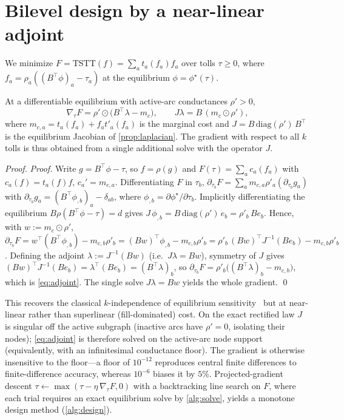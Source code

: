 \documentclass[ijoc]{informs3}
\begin{document}
\section{Bilevel design by a near-linear adjoint}\label{sec:design}
We minimize $F=\mathrm{TSTT}(f)=\sum_a t_a(f_a)f_a$ over tolls $\tau\ge0$, where $f_a=\rho_a((B^\top\phi)_a-\tau_a)$
at the equilibrium $\phi=\phi^\star(\tau)$.

\begin{proposition}\label{prop:adjoint}
At a differentiable equilibrium with active-arc conductances $\rho'>0$,
\begin{equation}\label{eq:adjoint}
\nabla_\tau F=\rho'\odot\big(B^\top\lambda-m_c\big),\qquad J\lambda=B\,(m_c\odot\rho'),
\end{equation}
where $m_{c,a}=t_a(f_a)+f_a t'_a(f_a)$ is the marginal cost and $J=B\,\mathrm{diag}(\rho')\,B^\top$ is the
equilibrium Jacobian of \cref{prop:laplacian}. The gradient with respect to all $k$ tolls is thus obtained from a
single additional solve with the operator $J$.
\end{proposition}
\begin{proof}{\it Proof.}
Write $g=B^\top\phi-\tau$, so $f=\rho(g)$ and $F(\tau)=\sum_a c_a(f_a)$ with $c_a(f)=t_a(f)f$, $c_a'=m_{c,a}$.
Differentiating $F$ in $\tau_b$, $\partial_{\tau_b}F=\sum_a m_{c,a}\rho'_a(\partial_{\tau_b}g_a)$ with
$\partial_{\tau_b}g_a=(B^\top\phi_{,b})_a-\delta_{ab}$, where $\phi_{,b}=\partial\phi^\star/\partial\tau_b$.
Implicitly differentiating the equilibrium $B\rho(B^\top\phi-\tau)=d$ gives
$J\,\phi_{,b}=B\,\mathrm{diag}(\rho')\,e_b=\rho'_b\,B e_b$. Hence, with $w:=m_c\odot\rho'$,
$\partial_{\tau_b}F=w^\top(B^\top\phi_{,b})-m_{c,b}\rho'_b=(Bw)^\top\phi_{,b}-m_{c,b}\rho'_b
=\rho'_b\,(Bw)^\top J^{-1}(Be_b)-m_{c,b}\rho'_b$. Defining the adjoint $\lambda:=J^{-1}(Bw)$ (i.e.\ $J\lambda=Bw$),
symmetry of $J$ gives $(Bw)^\top J^{-1}(Be_b)=\lambda^\top(Be_b)=(B^\top\lambda)_b$, so
$\partial_{\tau_b}F=\rho'_b\big((B^\top\lambda)_b-m_{c,b}\big)$, which is \cref{eq:adjoint}. The single solve
$J\lambda=Bw$ yields the whole gradient. \qed
\end{proof}
This recovers the classical $k$-independence of equilibrium sensitivity~\citep{tobinfriesz1988,jp2007} but at
near-linear rather than superlinear (fill-dominated) cost. On the exact rectified law $J$ is singular off the active subgraph
(inactive arcs have $\rho'=0$, isolating their nodes); \cref{eq:adjoint} is therefore solved on the active-arc
node support (equivalently, with an infinitesimal conductance floor). The gradient is otherwise insensitive to
the floor---a floor of $10^{-12}$ reproduces central finite differences to finite-difference accuracy, whereas
$10^{-6}$ biases it by $5\%$. Projected-gradient descent
$\tau\gets\max(\tau-\eta\,\nabla_\tau F,0)$ with a backtracking line search on $F$, where each trial requires an exact
equilibrium solve by \cref{alg:solve}, yields a monotone design method (\cref{alg:design}).
\end{document}
